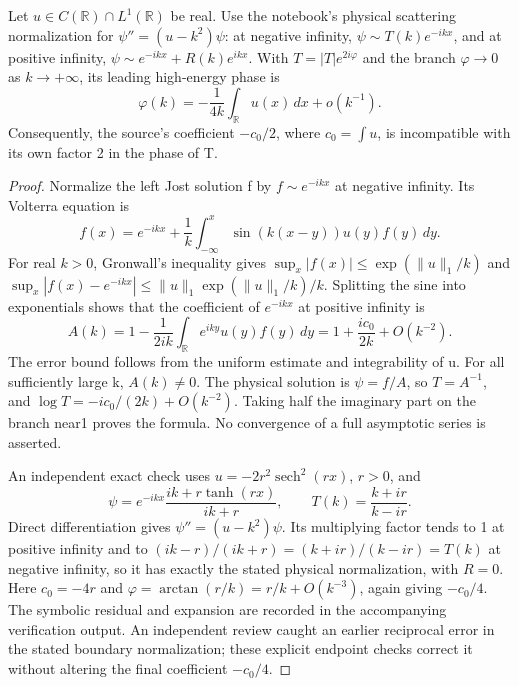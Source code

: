 \begin{proposition}\oursComputed{}
Let \(u\in C(\mathbb R)\cap L^1(\mathbb R)\) be real. Use the
notebook's physical scattering normalization for
\(\psi''=(u-k^2)\psi\): at negative infinity,
\(\psi\sim T(k)e^{-ikx}\), and at positive infinity,
\(\psi\sim e^{-ikx}+R(k)e^{ikx}\). With
\(T=|T|e^{2i\varphi}\) and the branch \(\varphi\to 0\) as
\(k\to+\infty\), its leading high-energy phase is
\[
 \varphi(k)=-\frac{1}{4k}\int_{\mathbb R}u(x)\,dx+o(k^{-1}).
\]
Consequently, the source's coefficient \(-c_0/2\), where
\(c_0=\int u\), is incompatible with its own factor 2 in the phase of T.
\end{proposition}
\begin{proof}
Normalize the left Jost solution f by \(f\sim e^{-ikx}\) at negative
infinity. Its Volterra equation is
\[
 f(x)=e^{-ikx}+\frac1k\int_{-\infty}^x
          \sin(k(x-y))u(y)f(y)\,dy.
\]
For real \(k>0\), Gronwall's inequality gives
\(\sup_x|f(x)|\le\exp(\|u\|_1/k)\) and
\(\sup_x|f(x)-e^{-ikx}|\le
\|u\|_1\exp(\|u\|_1/k)/k\).
Splitting the sine into exponentials shows that the coefficient of
\(e^{-ikx}\) at positive infinity is
\[
 A(k)=1-\frac1{2ik}\int_{\mathbb R}e^{iky}u(y)f(y)\,dy
     =1+\frac{i c_0}{2k}+O(k^{-2}).
\]
The error bound follows from the uniform estimate and integrability
of u. For all sufficiently large k, \(A(k)\ne0\).
The physical solution is \(\psi=f/A\), so \(T=A^{-1}\), and
\(\log T=-i c_0/(2k)+O(k^{-2})\). Taking half the imaginary part
on the branch near1 proves the formula. No convergence of a full
asymptotic series is asserted.

An independent exact check uses
\(u=-2r^2\operatorname{sech}^2(rx)\), \(r>0\), and
\[
 \psi=e^{-ikx}\frac{ik+r\tanh(rx)}{ik+r},\qquad
 T(k)=\frac{k+ir}{k-ir}.
\]
Direct differentiation gives \(\psi''=(u-k^2)\psi\). Its multiplying
factor tends to 1 at positive infinity and to
\((ik-r)/(ik+r)=(k+ir)/(k-ir)=T(k)\) at negative infinity,
so it has exactly the stated physical normalization, with \(R=0\).
Here \(c_0=-4r\) and \(\varphi=\arctan(r/k)=r/k+O(k^{-3})\),
again giving \(-c_0/4\). The symbolic residual and expansion are
recorded in the accompanying verification output. An independent
review caught an earlier reciprocal error in the stated boundary
normalization; these explicit endpoint checks correct it without
altering the final coefficient \(-c_0/4\).
\end{proof}

